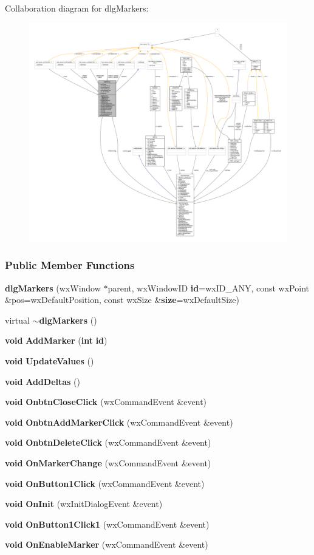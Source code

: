 Collaboration diagram for dlg\+Markers\+:
\nopagebreak
\begin{figure}[H]
\begin{center}
\leavevmode
\includegraphics[width=350pt]{d6/d14/classdlgMarkers__coll__graph}
\end{center}
\end{figure}
\subsubsection*{Public Member Functions}
\begin{DoxyCompactItemize}
\item 
{\bf dlg\+Markers} (wx\+Window $\ast$parent, wx\+Window\+ID {\bf id}=wx\+I\+D\+\_\+\+A\+NY, const wx\+Point \&pos=wx\+Default\+Position, const wx\+Size \&{\bf size}=wx\+Default\+Size)
\item 
virtual {\bf $\sim$dlg\+Markers} ()
\item 
{\bf void} {\bf Add\+Marker} ({\bf int} {\bf id})
\item 
{\bf void} {\bf Update\+Values} ()
\item 
{\bf void} {\bf Add\+Deltas} ()
\item 
{\bf void} {\bf Onbtn\+Close\+Click} (wx\+Command\+Event \&event)
\item 
{\bf void} {\bf Onbtn\+Add\+Marker\+Click} (wx\+Command\+Event \&event)
\item 
{\bf void} {\bf Onbtn\+Delete\+Click} (wx\+Command\+Event \&event)
\item 
{\bf void} {\bf On\+Marker\+Change} (wx\+Command\+Event \&event)
\item 
{\bf void} {\bf On\+Button1\+Click} (wx\+Command\+Event \&event)
\item 
{\bf void} {\bf On\+Init} (wx\+Init\+Dialog\+Event \&event)
\item 
{\bf void} {\bf On\+Button1\+Click1} (wx\+Command\+Event \&event)
\item 
{\bf void} {\bf On\+Enable\+Marker} (wx\+Command\+Event \&event)
\end{DoxyCompactItemize}
